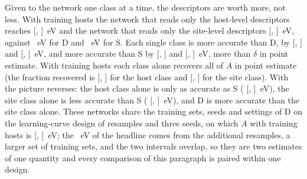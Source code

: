 Given to the network one class at a time, the descriptors are worth more, not less. With \numCfgBudgetsMax{} training hosts the network that reads only the \numNetDescriptorsHost{} host-level descriptors reaches \numNetDclassSixHundredFiftyFourMaeHost{} [\numNetDclassSixHundredFiftyFourMaeHostLo{}, \numNetDclassSixHundredFiftyFourMaeHostHi{}]~eV and the network that reads only the \numNetDescriptorsSite{} site-level descriptors \numNetDclassSixHundredFiftyFourMaeSite{} [\numNetDclassSixHundredFiftyFourMaeSiteLo{}, \numNetDclassSixHundredFiftyFourMaeSiteHi{}]~eV, against \numNetSixHundredFiftyFourMaeD{}~eV for D and \numNetSixHundredFiftyFourMaeS{}~eV for S. Each single class is more accurate than D, by \numNetDclassSixHundredFiftyFourGapDHost{} [\numNetDclassSixHundredFiftyFourGapDHostLo{}, \numNetDclassSixHundredFiftyFourGapDHostHi{}] and \numNetDclassSixHundredFiftyFourGapDSite{} [\numNetDclassSixHundredFiftyFourGapDSiteLo{}, \numNetDclassSixHundredFiftyFourGapDSiteHi{}]~eV, and more accurate than S by \numNetDclassSixHundredFiftyFourGapSHost{} [\numNetDclassSixHundredFiftyFourGapSHostLo{}, \numNetDclassSixHundredFiftyFourGapSHostHi{}] and \numNetDclassSixHundredFiftyFourGapSSite{} [\numNetDclassSixHundredFiftyFourGapSSiteLo{}, \numNetDclassSixHundredFiftyFourGapSSiteHi{}]~eV, more than $\delta$ in point estimate. With \numCfgBudgetsHostsItemFive{} training hosts each class alone recovers all of $A$ in point estimate (the fraction recovered is \numNetDclassFourHundredRatioHost{} [\numNetDclassFourHundredRatioHostLo{}, \numNetDclassFourHundredRatioHostHi{}] for the host class and \numNetDclassFourHundredRatioSite{} [\numNetDclassFourHundredRatioSiteLo{}, \numNetDclassFourHundredRatioSiteHi{}] for the site class). With \numCfgBudgetsHostsItemFour{} the picture reverses: the host class alone is only as accurate as S (\numNetDclassTwoHundredGapSHost{} [\numNetDclassTwoHundredGapSHostLo{}, \numNetDclassTwoHundredGapSHostHi{}]~eV), the site class alone is less accurate than S (\numNetDclassTwoHundredGapSSite{} [\numNetDclassTwoHundredGapSSiteLo{}, \numNetDclassTwoHundredGapSSiteHi{}]~eV), and D is more accurate than the site class alone. These networks share the training sets, seeds and settings of D on the learning-curve design of \numCfgSplitNOuterResamples{} resamples and three seeds, on which $A$ with \numCfgBudgetsMax{} training hosts is \numNetSixHundredFiftyFourA{} [\numNetSixHundredFiftyFourALo{}, \numNetSixHundredFiftyFourAHi{}]~eV; the \numNetHeadlineA{}~eV of the headline comes from the additional resamples, a larger set of training sets, and the two intervals overlap, so they are two estimates of one quantity and every comparison of this paragraph is paired within one design.


